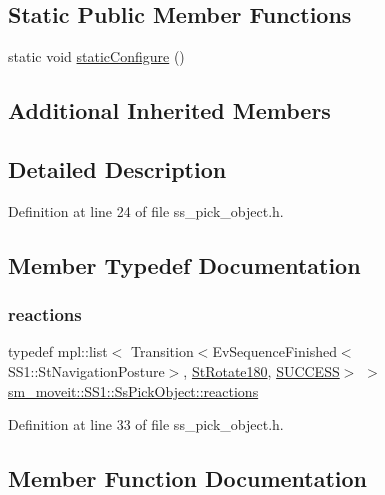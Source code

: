 \subsection*{Static Public Member Functions}
\begin{DoxyCompactItemize}
\item 
static void \hyperlink{structsm__moveit_1_1SS1_1_1SsPickObject_ab589ae81913b79dda9f94d03e5b0fa86}{static\+Configure} ()
\end{DoxyCompactItemize}
\subsection*{Additional Inherited Members}


\subsection{Detailed Description}


Definition at line 24 of file ss\+\_\+pick\+\_\+object.\+h.



\subsection{Member Typedef Documentation}
\mbox{\label{structsm__moveit_1_1SS1_1_1SsPickObject_a6fe2bd5b7184fd5ee2f5def21cc4423e}} 
\subsubsection{\texorpdfstring{reactions}{reactions}}
{\footnotesize\ttfamily typedef mpl\+::list$<$ Transition$<$Ev\+Sequence\+Finished$<$S\+S1\+::\+St\+Navigation\+Posture$>$, \hyperlink{structsm__moveit_1_1StRotate180}{St\+Rotate180}, \hyperlink{classSUCCESS}{S\+U\+C\+C\+E\+SS}$>$ $>$ \hyperlink{structsm__moveit_1_1SS1_1_1SsPickObject_a6fe2bd5b7184fd5ee2f5def21cc4423e}{sm\+\_\+moveit\+::\+S\+S1\+::\+Ss\+Pick\+Object\+::reactions}}



Definition at line 33 of file ss\+\_\+pick\+\_\+object.\+h.



\subsection{Member Function Documentation}
\mbox{\label{structsm__moveit_1_1SS1_1_1SsPickObject_aa5ad4c6436b70a13b27a45936876374c}} 
